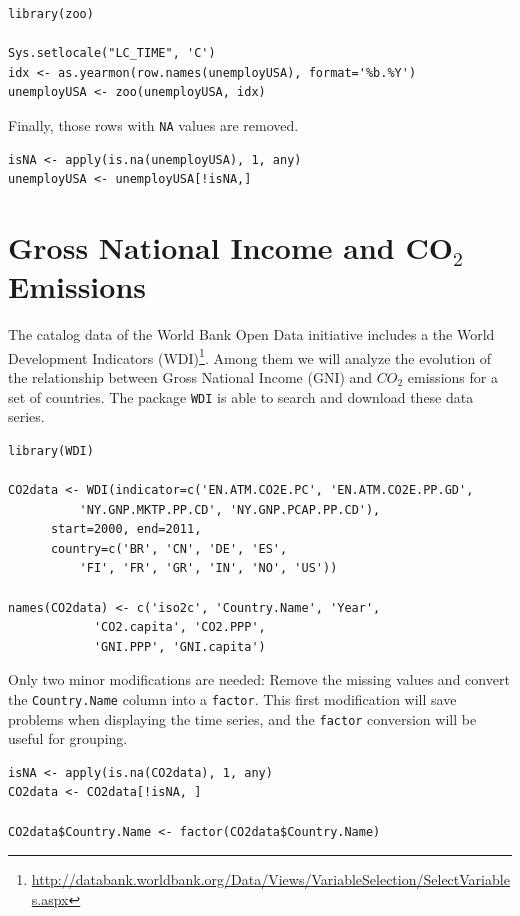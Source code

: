 
\lstset{language=R,numbers=none}
\begin{lstlisting}
library(zoo)

Sys.setlocale("LC_TIME", 'C')
idx <- as.yearmon(row.names(unemployUSA), format='%b.%Y')
unemployUSA <- zoo(unemployUSA, idx)
\end{lstlisting}

Finally, those rows with \texttt{NA} values are removed.
\lstset{language=R,numbers=none}
\begin{lstlisting}
isNA <- apply(is.na(unemployUSA), 1, any)
unemployUSA <- unemployUSA[!isNA,]
\end{lstlisting}
\section{Gross National Income and CO$_{\text{2}}$ Emissions}
\label{sec-3}
The catalog data of the World Bank Open Data initiative includes a the
World Development Indicators (WDI)\footnote{\url{http://databank.worldbank.org/Data/Views/VariableSelection/SelectVariables.aspx}}. Among them we will analyze
the evolution of the relationship between Gross National Income (GNI)
and $CO_2$ emissions for a set of countries. The package \texttt{WDI} is able
to search and download these data series.


\lstset{language=R,numbers=none}
\begin{lstlisting}
library(WDI)

CO2data <- WDI(indicator=c('EN.ATM.CO2E.PC', 'EN.ATM.CO2E.PP.GD',
	      'NY.GNP.MKTP.PP.CD', 'NY.GNP.PCAP.PP.CD'),
	  start=2000, end=2011,
	  country=c('BR', 'CN', 'DE', 'ES',
	      'FI', 'FR', 'GR', 'IN', 'NO', 'US'))

names(CO2data) <- c('iso2c', 'Country.Name', 'Year',
		    'CO2.capita', 'CO2.PPP',
		    'GNI.PPP', 'GNI.capita')
\end{lstlisting}

Only two minor modifications are needed: Remove the missing values and
convert the \texttt{Country.Name} column into a \texttt{factor}. This first
modification will save problems when displaying the time series, and
the \texttt{factor} conversion will be useful for grouping.
\lstset{language=R,numbers=none}
\begin{lstlisting}
isNA <- apply(is.na(CO2data), 1, any)
CO2data <- CO2data[!isNA, ]

CO2data$Country.Name <- factor(CO2data$Country.Name)
\end{lstlisting}
